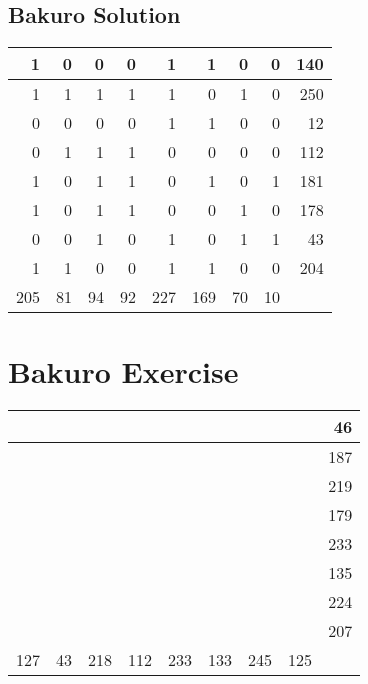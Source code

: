 \documentclass[]{article}
\begin{document}
 \subsection{Bakuro Solution} 
\begin{tabular}{rrrrrrrrr}
\hline
   1 &  0 &  0 &  0 &   1 &   1 &  0 &  0 & 140 \\ \hline
   1 &  1 &  1 &  1 &   1 &   0 &  1 &  0 & 250 \\ \hline
   0 &  0 &  0 &  0 &   1 &   1 &  0 &  0 &  12 \\ \hline
   0 &  1 &  1 &  1 &   0 &   0 &  0 &  0 & 112 \\ \hline
   1 &  0 &  1 &  1 &   0 &   1 &  0 &  1 & 181 \\ \hline
   1 &  0 &  1 &  1 &   0 &   0 &  1 &  0 & 178 \\ \hline
   0 &  0 &  1 &  0 &   1 &   0 &  1 &  1 &  43 \\ \hline
   1 &  1 &  0 &  0 &   1 &   1 &  0 &  0 & 204 \\ \hline
 205 & 81 & 94 & 92 & 227 & 169 & 70 & 10 &     \\ \hline
\hline
\end{tabular}\newpage\section{Bakuro Exercise}\begin{tabular}{rrrrrrrrr}
\hline
     &    &     &     &     &     &     &     &  46 \\ \hline
     &    &     &     &     &     &     &     & 187 \\ \hline
     &    &     &     &     &     &     &     & 219 \\ \hline
     &    &     &     &     &     &     &     & 179 \\ \hline
     &    &     &     &     &     &     &     & 233 \\ \hline
     &    &     &     &     &     &     &     & 135 \\ \hline
     &    &     &     &     &     &     &     & 224 \\ \hline
     &    &     &     &     &     &     &     & 207 \\ \hline
 127 & 43 & 218 & 112 & 233 & 133 & 245 & 125 &     \\ \hline
\hline
\end{tabular}\newpage 
\end{document}
